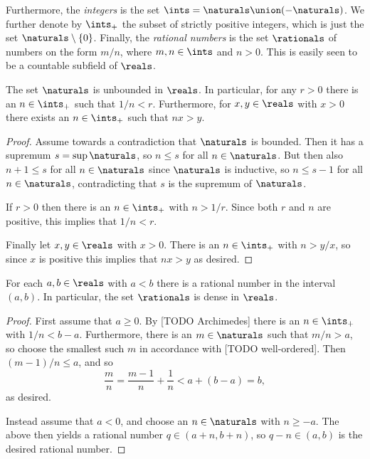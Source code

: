 \documentclass[article, a4paper, 11pt, oneside]{memoir}
\numberwithin{equation}{chapter}
\newcommand{\posints}{\ints_{+}}
\begin{document}
Furthermore, the \emph{integers} is the set $\ints = \naturals \union (-\naturals)$. We further denote by $\posints$ the subset of strictly positive integers, which is just the set $\naturals \setminus \{0\}$. Finally, the \emph{rational numbers} is the set $\rationals$ of numbers on the form $m/n$, where $m,n \in \ints$ and $n > 0$. This is easily seen to be a countable subfield of $\reals$.


\begin{proposition}
    The set $\naturals$ is unbounded in $\reals$. In particular, for any $r > 0$ there is an $n \in \posints$ such that $1/n < r$. Furthermore, for $x,y \in \reals$ with $x > 0$ there exists an $n \in \posints$ such that $nx > y$.
\end{proposition}

\begin{proof}
    Assume towards a contradiction that $\naturals$ is bounded. Then it has a supremum $s = \sup \naturals$, so $n \leq s$ for all $n \in \naturals$. But then also $n+1 \leq s$ for all $n \in \naturals$ since $\naturals$ is inductive, so $n \leq s-1$ for all $n \in \naturals$, contradicting that $s$ is the supremum of $\naturals$.

    If $r > 0$ then there is an $n \in \posints$ with $n > 1/r$. Since both $r$ and $n$ are positive, this implies that $1/n < r$.

    Finally let $x,y \in \reals$ with $x > 0$. There is an $n \in \posints$ with $n > y/x$, so since $x$ is positive this implies that $nx > y$ as desired.
\end{proof}


\begin{corollary}
    For each $a,b \in \reals$ with $a < b$ there is a rational number in the interval $(a,b)$. In particular, the set $\rationals$ is dense in $\reals$.
\end{corollary}

\begin{proof}
    First assume that $a \geq 0$. By [TODO Archimedes] there is an $n \in \posints$ with $1/n < b-a$. Furthermore, there is an $m \in \naturals$ such that $m/n > a$, so choose the smallest such $m$ in accordance with [TODO well-ordered]. Then $(m-1)/n \leq a$, and so
    \begin{equation*}
        \frac{m}{n}
            = \frac{m-1}{n} + \frac{1}{n}
            < a + (b-a)
            = b,
    \end{equation*}
    as desired.

    Instead assume that $a < 0$, and choose an $n \in \naturals$ with $n \geq -a$. The above then yields a rational number $q \in (a+n,b+n)$, so $q-n \in (a,b)$ is the desired rational number.
\end{proof}
\end{document}
